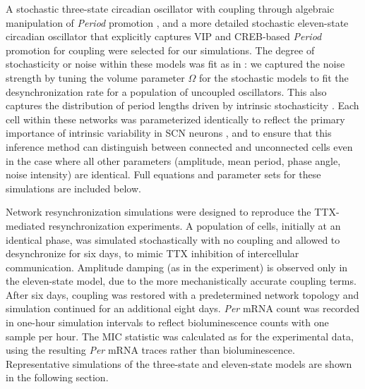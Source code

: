A stochastic three-state circadian oscillator with coupling through algebraic manipulation of \textit{Period} promotion \cite{Gonze2006, Schroder2012}, and a more detailed stochastic eleven-state circadian oscillator that explicitly captures VIP and CREB-based \textit{Period} promotion for coupling \cite{Abel2015a} were selected for our simulations.
The degree of stochasticity or noise within these models was fit as in \cite{Rougemont2007, StJohn2014b}: we captured the noise strength by tuning the volume parameter $\Omega$ for the stochastic models to fit the desynchronization rate for a population of uncoupled oscillators.
This also captures the distribution of period lengths driven by intrinsic stochasticity \cite{StJohn2015}.
Each cell within these networks was parameterized identically to reflect the primary importance of intrinsic variability in SCN neurons \cite{Herzog2004a}, and to ensure that this inference method can distinguish between connected and unconnected cells even in the case where all other parameters (amplitude, mean period, phase angle, noise intensity) are identical.
Full equations and parameter sets for these simulations are included below.

Network resynchronization simulations were designed to reproduce the TTX-mediated resynchronization experiments.
A population of cells, initially at an identical phase, was simulated stochastically with no coupling and allowed to desynchronize for six days, to mimic TTX inhibition of intercellular communication.
Amplitude damping (as in the experiment) is observed only in the eleven-state model, due to the more mechanistically accurate coupling terms.
After six days, coupling was restored with a predetermined network topology and simulation continued for an additional eight days.
\textit{Per} mRNA count was recorded in one-hour simulation intervals to reflect bioluminescence counts with one sample per hour.
The MIC statistic was calculated as for the experimental data, using the resulting \textit{Per} mRNA traces rather than bioluminescence.
Representative simulations of the three-state and eleven-state models are shown in the following section.


